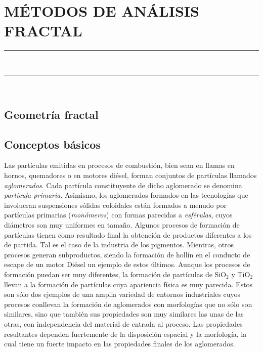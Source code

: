 \chapter{MÉTODOS DE ANÁLISIS FRACTAL}\label{cap:MetodosAnalisisFractal}
\noindent\rule{\linewidth}{1.3pt}\\
\startcontents[chapters]
\noindent\rule{\linewidth}{1.1pt}\\
\newpage
\section{Geometría fractal}\label{sec:GeometriaFractal}
\section{Conceptos básicos}\label{sec:ConceptosBasicosDimension}
\par Las partículas emitidas en procesos de combustión, bien sean en llamas en hornos, quemadores o en motores diésel, forman conjuntos de partículas llamados  \emph{aglomerados}. Cada partícula constituyente de dicho aglomerado se denomina  \emph{partícula primaria}. Asimismo, los aglomerados formados en las tecnologías que involucran suspensiones sólidas coloidales están formados a menudo por partículas primarias (\emph{monómeros}) con formas parecidas a  \emph{esférulas}, cuyos diámetros son muy uniformes en tamaño. Algunos procesos de formación de partículas tienen como resultado final la obtención de productos diferentes a los de partida. Tal es el caso de la industria de los pigmentos. Mientras, otros procesos generan subproductos, siendo la formación de hollín en el conducto de escape de un motor Diésel un ejemplo de estos últimos. Aunque los procesos de formación puedan ser muy diferentes, la formación de partículas de SiO$_2$ y TiO$_2$ llevan a la formación de partículas cuya apariencia física es muy parecida. Estos son sólo dos ejemplos de una amplia variedad de entornos industriales cuyos procesos conllevan la formación de aglomerados con morfologías que no sólo son similares, sino que también sus propiedades son muy similares las unas de las otras, con independencia del material de entrada al proceso. Las propiedades resultantes dependen fuertemente de la disposición espacial y la morfología, la cual tiene un fuerte impacto en las propiedades finales de los aglomerados.

